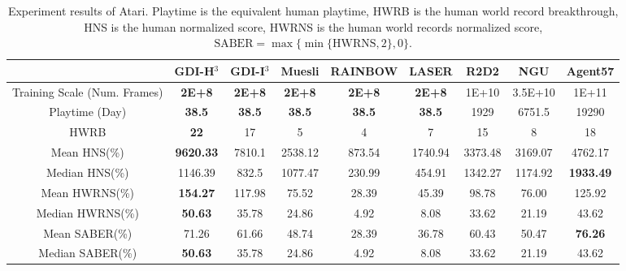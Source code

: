 \documentclass[nohyperref]{article}
\def\GDIHmeanhns{9620.33}
\def\GDIHmedianhns{1146.39}
\def\GDIHHWRB{22}
\def\GDIHmeanHWRNS{154.27}
\def\GDIHmedianHWRNS{50.63}
\def\GDIHmeanSABER{71.26}
\def\GDIHmedianSABER{50.63}
\def\GDIHgametime{38.5}
\def\GDIImeanhns{7810.1}
\def\GDIImedianhns{832.5}
\def\GDIIHWRB{17}
\def\GDIImeanHWRNS{117.98}
\def\GDIImedianHWRNS{35.78}
\def\GDIImeanSABER{61.66}
\def\GDIImedianSABER{35.78}
\def\GDIIgametime{38.5}
\def\rainbowmeanhns{873.54}
\def\rainbowmedianhns{230.99}
\def\rainbowHWRB{4}
\def\rainbowmeanHWRNS{28.39}
\def\rainbowmedianHWRNS{4.92}
\def\rainbowmeanSABER{28.39}
\def\rainbowmedianSABER{4.92}
\def\rainbowgametime{38.5}
\def\lasermeanhns{1740.94}
\def\lasermedianhns{454.91}
\def\laserHWRB{7}
\def\lasermeanHWRNS{45.39}
\def\lasermedianHWRNS{8.08}
\def\lasermeanSABER{36.78}
\def\lasermedianSABER{8.08}
\def\lasergametime{38.5}
\def\rtdtmeanhns{3373.48}
\def\rtdtmedianhns{1342.27}
\def\rtdtHWRB{15}
\def\rtdtmeanHWRNS{98.78}
\def\rtdtmedianHWRNS{33.62}
\def\rtdtmeanSABER{60.43}
\def\rtdtmedianSABER{33.62}
\def\rtdtgametime{1929}
\def\ngumeanhns{3169.07}
\def\ngumedianhns{1174.92}
\def\nguHWRB{8}
\def\ngumeanHWRNS{76.00}
\def\ngumedianHWRNS{21.19}
\def\ngumeanSABER{50.47}
\def\ngumedianSABER{21.19}
\def\ngugametime{6751.5}
\def\agentmeanhns{4762.17}
\def\agentmedianhns{1933.49}
\def\agentHWRB{18}
\def\agentmeanHWRNS{125.92}
\def\agentmedianHWRNS{43.62}
\def\agentmeanSABER{76.26}
\def\agentmedianSABER{43.62}
\def\agentgametime{19290}
\def\mueslimeanhns{2538.12}
\def\mueslimedianhns{1077.47}
\def\muesliHWRB{5}
\def\mueslimeanHWRNS{75.52}
\def\mueslimedianHWRNS{24.86}
\def\mueslimeanSABER{48.74}
\def\mueslimedianSABER{24.86}
\def\muesligametime{38.5}
\theoremstyle{plain}
\begin{document}
\begin{table*}[!htbp]
\small
\setlength{\tabcolsep}{1.0pt}
    \centering
    \caption{Experiment results of Atari. Playtime is the equivalent human playtime, HWRB is the human world record breakthrough, HNS is the human normalized score, HWRNS is the human world records normalized score, $\text{SABER}=\max\{\min\{\text{HWRNS},2\},0\}$.}
    \label{tab:atari_results}
    \begin{tabular}{c c c c c c c c c}
    \toprule
                      & GDI-H$^3$                   & GDI-I$^3$               & Muesli & RAINBOW & LASER & R2D2 & NGU & Agent57\\
    \midrule
     Training Scale (Num. Frames)      &\textbf{2E+8}        &\textbf{2E+8}       &\textbf{2E+8}  & \textbf{2E+8} & \textbf{2E+8}  & 1E+10   & 3.5E+10  &1E+11 \\
    Playtime (Day)  & \textbf{\GDIHgametime}       & \textbf{\GDIIgametime}      & \textbf{\muesligametime} & \textbf{\rainbowgametime} & \textbf{\lasergametime}  & \rtdtgametime   & \ngugametime    & \agentgametime \\
    HWRB              &\textbf{\GDIHHWRB}          &\GDIIHWRB         & \muesliHWRB             & \rainbowHWRB             & \laserHWRB              & \rtdtHWRB      & \nguHWRB & \agentHWRB \\
    Mean HNS(\%)      &\textbf{\GDIHmeanhns}     &\GDIImeanhns    & \mueslimeanhns        & \rainbowmeanhns        & \lasermeanhns        & \rtdtmeanhns &\ngumeanhns   &\agentmeanhns \\
    Median HNS(\%)    &\GDIHmedianhns               &\GDIImedianhns               & \mueslimedianhns        & \rainbowmedianhns        & \lasermedianhns         & \rtdtmedianhns & \ngumedianhns   &\textbf{\agentmedianhns}\\
    Mean HWRNS(\%)    &\textbf{\GDIHmeanHWRNS}      &\GDIImeanHWRNS              & \mueslimeanHWRNS         & \rainbowmeanHWRNS         & \lasermeanHWRNS           & \rtdtmeanHWRNS   & \ngumeanHWRNS     &\agentmeanHWRNS\\
    Median HWRNS(\%)  &\textbf{\GDIHmedianHWRNS}                &\GDIImedianHWRNS               & \mueslimedianHWRNS          & \rainbowmedianHWRNS          & \lasermedianHWRNS           &\rtdtmedianHWRNS    & \ngumedianHWRNS    &\agentmedianHWRNS\\
    Mean SABER(\%)    &\GDIHmeanSABER                &\GDIImeanSABER               & \mueslimeanSABER          & \rainbowmeanSABER         & \lasermeanSABER          &\rtdtmeanSABER    &\ngumeanSABER &\textbf{\agentmeanSABER}\\
    Median SABER(\%)  &\textbf{\GDIHmedianSABER}                & \GDIImedianSABER              & \mueslimedianSABER          & \rainbowmedianSABER         & \lasermedianSABER           &\rtdtmedianSABER    & \ngumedianSABER     &\agentmedianSABER\\
    \bottomrule
    \end{tabular}
\end{table*}
\normalsize
\end{document}
